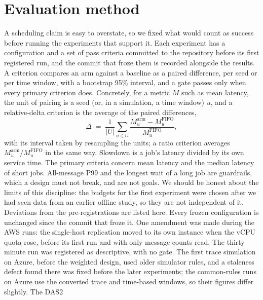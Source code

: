 \section{Evaluation method}\label{sec:method}

A scheduling claim is easy to overstate, so we fixed what would count as success before running the experiments that
support it. Each experiment has a configuration and a set of pass criteria committed to the repository before its first
registered run, and the commit that froze them is recorded alongside the results. A criterion compares an arm against a
baseline as a paired difference, per seed or per time window, with a bootstrap 95\% interval, and a gate passes only when
every primary criterion does. Concretely, for a metric $M$ such as mean latency, the unit of pairing is a seed (or, in a simulation, a time window) $u$, and a
relative-delta criterion is the average of the paired differences,
\begin{equation}
  \Delta \;=\; \frac{1}{|U|}\sum_{u\in U}\frac{M_u^{\text{arm}}-M_u^{\text{FIFO}}}{M_u^{\text{FIFO}}},
  \label{eq:delta}
\end{equation}
with its interval taken by resampling the units; a ratio criterion averages $M_u^{\text{arm}}/M_u^{\text{FIFO}}$ in the same way. Slowdown is a job's
latency divided by its own service time. The primary criteria concern mean latency and the median latency of short jobs. All-message
P99 and the longest wait of a long job are guardrails, which a design must not break, and are not goals. We should be
honest about the limits of this discipline: the budgets for the first experiment were chosen after we had seen data
from an earlier offline study, so they are not independent of it. Deviations from the pre-registrations are listed here. Every frozen configuration is unchanged since the commit that froze it. One amendment was
made during the AWS runs: the single-host replication moved to its own instance when the vCPU quota rose, before its first run and with only message counts read. The thirty-minute run
was registered as descriptive, with no gate. The first trace simulation on Azure, before the weighted design, used older simulator rules, and a staleness defect
found there was fixed before the later experiments; the common-rules runs on Azure use the converted trace and time-based windows, so their figures differ slightly. The DAS2
